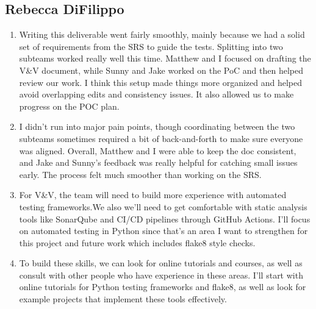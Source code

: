 \documentclass[12pt, titlepage]{article}
\begin{document}
\subsection*{Rebecca DiFilippo}
\begin{enumerate}
    \item Writing this deliverable went fairly smoothly, mainly because we had a solid set of 
    requirements from the SRS to guide the tests. Splitting into two subteams worked really well
     this time. Matthew and I focused on drafting the V\&V document, while Sunny and Jake worked 
     on the PoC and then helped review our work. I think this setup made things more organized and
      helped avoid overlapping edits and consistency issues. It also allowed us to make progress
      on the POC plan.
    
    \item I didn’t run into major pain points, though coordinating between the two subteams
     sometimes required a bit of back-and-forth to make sure everyone was aligned. Overall, Matthew
      and I were able to keep the doc consistent, and Jake and Sunny’s feedback was really helpful
       for catching small issues early. The process felt much smoother than working on the SRS. 
    
    \item For V\&V, the team will need to build more experience with automated testing frameworks.We also we’ll need to
       get comfortable with static analysis tools like SonarQube and CI/CD pipelines through GitHub
        Actions. I’ll focus on automated testing in Python since that’s an area I want to strengthen
         for this project and future work which includes flake8 style checks.
    
    \item To build these skills, we can look for online  tutorials and courses, as well as consult
      with other people who have experience in these areas. I’ll start with online tutorials for
       Python testing frameworks and flake8, as well as look for example projects that implement
        these tools effectively.
\end{enumerate}
\end{document}
